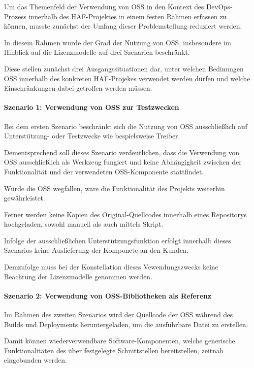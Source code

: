 Um das Themenfeld der Verwendung von OSS in den Kontext des DevOps-Prozess innerhalb des HAF-Projektes in einem festen Rahmen erfassen zu können, musste zunächst der Umfang dieser Problemstellung reduziert werden. 

In diesem Rahmen wurde der Grad der Nutzung von OSS, insbesondere im Hinblick auf die Lizenzmodelle auf drei Szenarien beschränkt. 

Diese stellen zunächst drei Ausgangssituationen dar, unter welchen Bedinungen OSS innerhalb des konkreten HAF-Projekes verwendet werden dürfen und welche Einschränkungen dabei getroffen werden müssen.   

\paragraph{Szenario 1: Verwendung von OSS zur Testzwecken}

Bei dem ersten Szenario beschränkt sich die Nutzung von OSS ausschließlich auf Unterstützung- oder Testzwecke wie bespielsweise Treiber. 

Dementsprechend soll dieses Szenario verdeutlichen, dass die Verwendung von OSS ausschließlich als Werkzeug fungiert und keine Abhängigkeit zwischen der Funktionalität und der verwendeten OSS-Komponente stattfindet. 

Würde die OSS wegfallen, wäre die Funktionalität des Projekts weiterhin gewährleistet. 

Ferner werden keine Kopien des Original-Quellcodes innerhalb eines Repositorys hochgeladen, sowohl manuell als auch mittels Skript. 

Infolge der ausschließlichen Unterstützungsfunktion erfolgt innerhalb dieses Szenarios keine Auslieferung der Komponete an den Kunden. 

Demzufolge muss bei der Konstellation dieses Vewendungszwecks keine Beachtung der Lizenzmodelle genommen werden. 

\paragraph{Szenario 2: Verwendung von OSS-Bibliotheken als Referenz}

Im Rahmen des zweiten Szenarios wird der Quellcode der OSS während des Builds und Deployments heruntergeladen, um die ausführbare Datei zu erstellen. 

Damit können wiederverwendbare Software-Komponenten, welche generische Funktionalitäten des über festgelegte Schnittstellen bereitstellen, zeitnah eingebunden werden.

